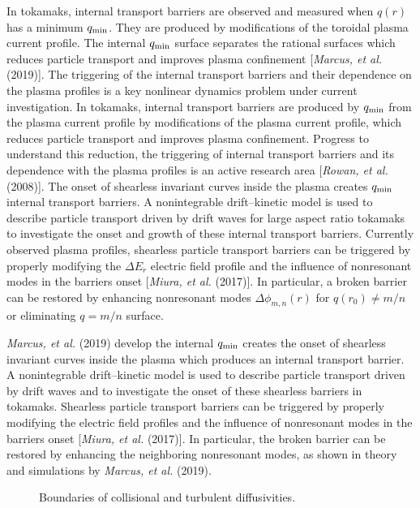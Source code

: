 \documentclass[a4paper,openany,12pt]{report}
\begin{document}
In tokamaks, internal transport barriers are observed and measured when $q(r)$ has a minimum $q_{\rm min}$. They are produced by modifications of the toroidal plasma current profile. The internal $q_{\rm min}$ surface separates the rational surfaces which reduces particle transport and improves plasma confinement [\emph{Marcus, et al.} (2019)]. The triggering of the internal transport barriers and their dependence on the plasma profiles is a key nonlinear dynamics problem under current investigation. In tokamaks, internal transport barriers are produced by $q_{\rm min}$ from the plasma current profile
by modifications of the plasma current profile, which reduces particle transport and improves plasma confinement. Progress to understand this reduction, the triggering of internal transport barriers and its dependence with the plasma profiles is an active research area [\emph{Rowan, et al.} (2008)]. The onset of shearless invariant curves inside the plasma creates $q_{\rm min}$ internal transport barriers. A nonintegrable drift--kinetic model is used to describe particle transport driven by drift waves for large aspect ratio tokamaks to investigate the onset and growth of these internal transport barriers. Currently observed plasma profiles, shearless particle transport barriers can be triggered by properly modifying the $\Delta E_r$ electric field profile and the influence of nonresonant modes in the barriers onset [\emph{Miura, et al.} (2017)]. In particular, a broken barrier can be restored by enhancing nonresonant modes $\Delta\phi_{m,n}(r)$ for $q(r_0)\ne m/n$ or eliminating $q=m/n$ surface.

\emph{Marcus, et al.} (2019) develop the internal $q_{\rm min}$ creates the onset of shearless invariant curves inside the plasma which produces an internal transport barrier. A nonintegrable drift--kinetic model is used to describe particle transport driven by drift waves and to investigate the onset of these shearless barriers in tokamaks. Shearless particle transport barriers can be triggered by properly modifying the electric field profiles and the influence of nonresonant modes in the barriers onset [\emph{Miura, et al.} (2017)]. In particular, the broken barrier can be restored by enhancing the neighboring nonresonant modes, as shown in theory and simulations by \emph{Marcus, et al.} (2019).
%
\begin{figure}[H]
\renewcommand{\thefigure}{4.2}
\centerline{}%
\centerline{}%
\caption{Boundaries of collisional and turbulent diffusivities.}
\label{F9.42}
\end{figure}
%
\end{document}
